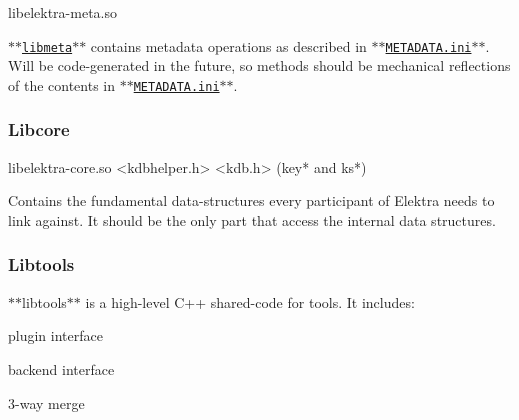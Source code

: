 \begin{DoxyVerb}libelektra-meta.so
\end{DoxyVerb}


$\ast$$\ast$\href{/home/markus/Projekte/Elektra/current/src/libs/meta/meta.c}{\tt libmeta}$\ast$$\ast$ contains metadata operations as described in $\ast$$\ast$\href{/home/markus/Projekte/Elektra/current/doc/METADATA.ini}{\tt M\+E\+T\+A\+D\+A\+T\+A.\+ini}$\ast$$\ast$. Will be code-\/generated in the future, so methods should be mechanical reflections of the contents in $\ast$$\ast$\href{/home/markus/Projekte/Elektra/current/doc/METADATA.ini}{\tt M\+E\+T\+A\+D\+A\+T\+A.\+ini}$\ast$$\ast$.

\subsubsection*{Libcore}

\begin{DoxyVerb}libelektra-core.so
<kdbhelper.h>
<kdb.h> (key* and ks*)
\end{DoxyVerb}


Contains the fundamental data-\/structures every participant of Elektra needs to link against. It should be the only part that access the internal data structures.

\subsubsection*{Libtools}

$\ast$$\ast$libtools$\ast$$\ast$ is a high-\/level C++ shared-\/code for tools. It includes\+:


\begin{DoxyItemize}
\item plugin interface
\item backend interface
\item 3-\/way merge 
\end{DoxyItemize}